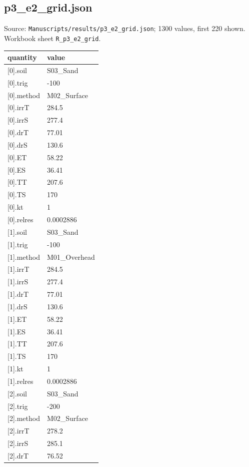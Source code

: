 \subsection*{p3\_e2\_grid.json}
\noindent\small Source: \nolinkurl{Manuscripts/results/p3_e2_grid.json}; 1300 values, first 220 shown. Workbook sheet \texttt{R\_p3\_e2\_grid}.\par
{\scriptsize\begin{longtable}{p{}p{}}\toprule\textbf{quantity} & \textbf{value}\\\midrule\endhead
{}[0].soil & S03\_Sand\\
{}[0].trig & -100\\
{}[0].method & M02\_Surface\\
{}[0].irrT & 284.5\\
{}[0].irrS & 277.4\\
{}[0].drT & 77.01\\
{}[0].drS & 130.6\\
{}[0].ET & 58.22\\
{}[0].ES & 36.41\\
{}[0].TT & 207.6\\
{}[0].TS & 170\\
{}[0].kt & 1\\
{}[0].relres & 0.0002886\\
{}[1].soil & S03\_Sand\\
{}[1].trig & -100\\
{}[1].method & M01\_Overhead\\
{}[1].irrT & 284.5\\
{}[1].irrS & 277.4\\
{}[1].drT & 77.01\\
{}[1].drS & 130.6\\
{}[1].ET & 58.22\\
{}[1].ES & 36.41\\
{}[1].TT & 207.6\\
{}[1].TS & 170\\
{}[1].kt & 1\\
{}[1].relres & 0.0002886\\
{}[2].soil & S03\_Sand\\
{}[2].trig & -200\\
{}[2].method & M02\_Surface\\
{}[2].irrT & 278.2\\
{}[2].irrS & 285.1\\
{}[2].drT & 76.52\\

\end{longtable}}
